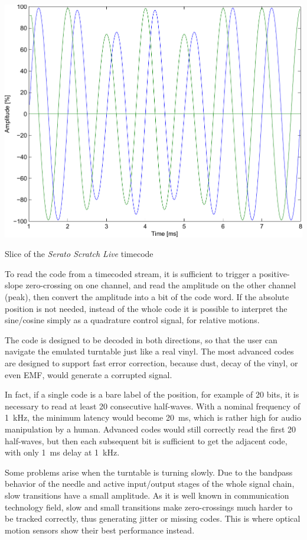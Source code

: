 \documentclass[a4paper,10pt]{article}
\makeatletter
\newenvironment{figurehere}{\def\@captype{figure}\vspace{2ex}}{\vspace{2ex}}
\makeatother
\begin{document}
\begin{multicols}{2}
\begin{figurehere}
	\centering
	\includegraphics[keepaspectratio=true,width=\columnwidth]{images/serato_timecode_slice.pdf}
	\caption{Slice of the \emph{Serato Scratch Live} timecode}
	\label{fig:serato_timecode_slice}
\end{figurehere}

To read the code from a timecoded stream, it is sufficient to trigger a
positive-slope zero-crossing on one channel, and read the amplitude on the
other channel (peak), then convert the amplitude into a bit of the code
word. If the absolute position is not needed, instead of the whole code it
is possible to interpret the sine/cosine simply as a quadrature control
signal, for relative motions.

The code is designed to be decoded in both directions, so that the user can
navigate the emulated turntable just like a real vinyl. The most advanced
codes are designed to support fast error correction, because dust, decay of
the vinyl, or even EMF, would generate a corrupted signal.

In fact, if a single code is a bare label of the position, for example of 20
bits, it is necessary to read at least 20 consecutive half-waves. With a
nominal frequency of 1~kHz, the minimum latency would become 20~ms, which is
rather high for audio manipulation by a human. Advanced codes would still
correctly read the first 20 half-waves, but then each subsequent bit is
sufficient to get the adjacent code, with only 1~ms delay at 1~kHz.

Some problems arise when the turntable is turning slowly. Due to the bandpass
behavior of the needle and active input/output stages of the whole signal
chain, slow transitions have a small amplitude. As it is well known in
communication technology field, slow and small transitions make zero-crossings
much harder to be tracked correctly, thus generating jitter or missing codes.
This is where optical motion sensors show their best performance instead.


\end{multicols}
\end{document}

